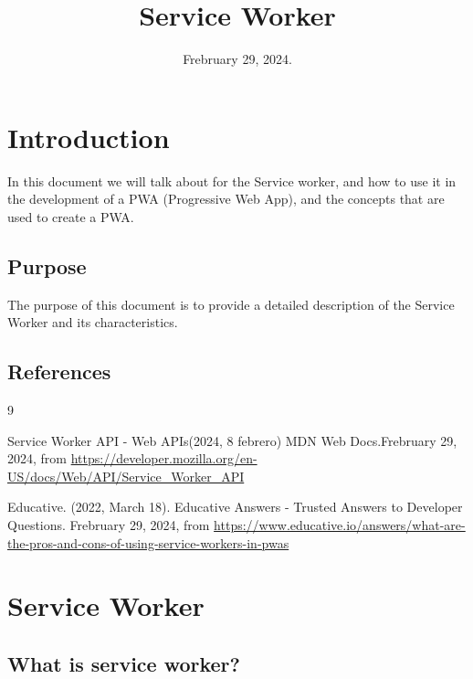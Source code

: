 \documentclass[12pt,a4paper, twosite]{article}
\date{Frebruary 29, 2024.}
\title{Service Worker}
\begin{document}
\maketitle

\newpage
\tableofcontents

\newpage

\section{Introduction}
\label{sec:org60390fa}

In this document we will talk about for the Service worker, and how to use it in the development of a PWA (Progressive Web App), and the concepts that are used to create a PWA.

\subsection{Purpose}
\label{sec:org434c3ef}

The purpose of this document is to provide a detailed description of the Service Worker and its characteristics.

\subsection{References}
\label{sec:org62711e0}

\begin{thebibliography}
{9}

 Service Worker API - Web APIs(2024, 8 febrero) MDN Web Docs.Frebruary 29, 2024, from \url{https://developer.mozilla.org/en-US/docs/Web/API/Service_Worker_API}

 Educative.  (2022, March 18). Educative Answers - Trusted Answers to Developer Questions. Frebruary 29, 2024, from \url{https://www.educative.io/answers/what-are-the-pros-and-cons-of-using-service-workers-in-pwas}


\end{thebibliography}


\section{Service Worker}
\label{sec:orgc1c4017}

\subsection{What is service worker?}
\label{sec:org24980a8}
\end{document}
